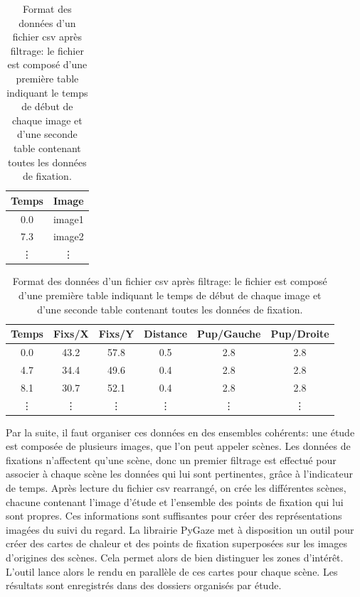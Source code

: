 \documentclass[hidelinks,12pt]{article}
\begin{document}
\bigskip
\begin{table}[htpb]
  \begin{adjustwidth}{0.05\textwidth}{0cm}
    \begin{tabular}{|c||c|}
      \hline
      Temps  & Image  \\
      \hline
      0.0    & image1 \\
      7.3    & image2 \\
      \vdots & \vdots \\
      \hline
    \end{tabular}
    \newline
    \begin{tabular}{|c||c|c|c|c|c|}
      \hline
      Temps  & Fixs/X & Fixs/Y & Distance & Pup/Gauche & Pup/Droite \\
      \hline
      0.0    & 43.2   & 57.8   & 0.5      & 2.8        & 2.8        \\
      4.7    & 34.4   & 49.6   & 0.4      & 2.8        & 2.8        \\
      8.1    & 30.7   & 52.1   & 0.4      & 2.8        & 2.8        \\
      \vdots & \vdots & \vdots & \vdots   & \vdots     & \vdots     \\
      \hline
    \end{tabular}
  \end{adjustwidth}
  \caption{Format des données d'un fichier csv après filtrage: le fichier est composé d'une première table indiquant le temps de début de chaque image et d'une seconde table contenant toutes les données de fixation.}
  \label{tab:format-csv}
\end{table}

Par la suite, il faut organiser ces données en des ensembles cohérents: une
étude est composée de plusieurs images, que l'on peut appeler scènes. Les
données de fixations n'affectent qu'une scène, donc un premier filtrage est
effectué pour associer à chaque scène les données qui lui sont pertinentes,
grâce à l'indicateur de temps. Après lecture du fichier csv rearrangé, on crée
les différentes scènes, chacune contenant l'image d'étude et l'ensemble des
points de fixation qui lui sont propres. Ces informations sont suffisantes pour
créer des représentations imagées du suivi du regard. La librairie PyGaze met à
disposition un outil pour créer des cartes de chaleur et des points de fixation
superposées sur les images d'origines des scènes. Cela permet alors de bien
distinguer les zones d'intérêt. L'outil lance alors le rendu en parallèle de
ces cartes pour chaque scène. Les résultats sont enregistrés dans des dossiers
organisés par étude.
\end{document}
